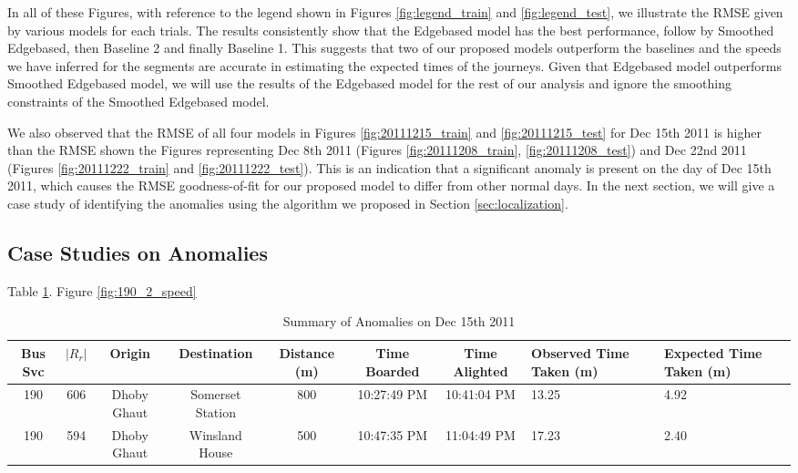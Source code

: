 \documentclass{sig-alternate}
\begin{document}
In all of these Figures, with reference to the legend shown in Figures \ref{fig:legend_train} and \ref{fig:legend_test}, we illustrate the RMSE given by various models for each trials. The results consistently show that the Edgebased model has the best performance, follow by Smoothed Edgebased, then Baseline 2 and finally Baseline 1. This suggests that two of our proposed models outperform the baselines and the speeds we have inferred for the segments are accurate in estimating the expected times of the journeys. Given that Edgebased model outperforms Smoothed Edgebased model, we will use the results of the Edgebased model for the rest of our analysis and ignore the smoothing constraints of the Smoothed Edgebased model.

We also observed that the RMSE of all four models in Figures \ref{fig:20111215_train} and \ref{fig:20111215_test} for Dec 15th 2011 is higher than the RMSE shown the Figures representing Dec 8th 2011 (Figures \ref{fig:20111208_train}, \ref{fig:20111208_test}) and Dec 22nd 2011 (Figures \ref{fig:20111222_train} and \ref{fig:20111222_test}). This is an indication that a significant anomaly is present on the day of Dec 15th 2011, which causes the RMSE goodness-of-fit for our proposed model to differ from other normal days. In the next section, we will give a case study of identifying the anomalies using the algorithm we proposed in Section \ref{sec:localization}.

\subsection{Case Studies on Anomalies}
Table \ref{tbl:anomalies}. Figure \ref{fig:190_2_speed}

\begin{table}[htb]
	\small
	\centering
	\caption{Summary of Anomalies on Dec 15th 2011}
	\label{tbl:anomalies}
	\begin{tabular}{|c|c|c|c|c|c|c|p{1.5cm}|p{1.5cm}|}
		\hline
		Bus Svc & $|R_r|$ & Origin & Destination & Distance (m) & Time Boarded & Time Alighted & Observed Time Taken (m) & Expected Time Taken (m) \\
		\hline
		190 & 606 & Dhoby Ghaut & Somerset Station & 800 & 10:27:49 PM & 10:41:04 PM & 13.25 & 4.92 \\
		\hline
		190 & 594 & Dhoby Ghaut & Winsland House & 500 & 10:47:35 PM & 11:04:49 PM & 17.23 & 2.40 \\
		\hline
	\end{tabular}
\end{table}
\end{document}

